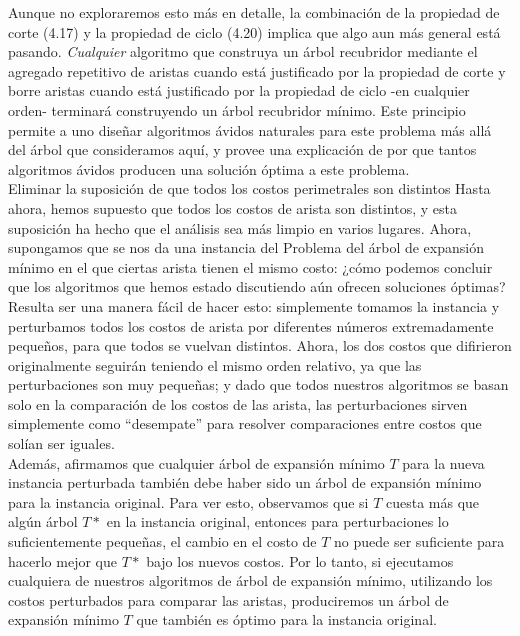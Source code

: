 \documentclass[a4paper, 12pt]{book}
\theoremstyle{dotless}
\begin{document}
Aunque no exploraremos esto más en detalle, la combinación de la propiedad de corte (4.17) y la propiedad de ciclo (4.20) implica que algo aun más general está pasando. \textit{Cualquier} algoritmo que construya un árbol recubridor mediante el agregado repetitivo de aristas cuando está justificado por la propiedad de corte y borre aristas cuando está justificado por la propiedad de ciclo -en cualquier orden- terminará construyendo un árbol recubridor mínimo. Este principio permite a uno diseñar algoritmos ávidos naturales para este problema más allá del árbol que consideramos aquí, y provee una explicación de por que tantos algoritmos ávidos producen una solución óptima a este problema.\\
    
Eliminar la suposición de que todos los costos perimetrales son distintos Hasta ahora, hemos supuesto que todos los costos de arista son distintos, y esta suposición ha hecho que el análisis sea más limpio en varios lugares. Ahora, supongamos que se nos da una instancia del Problema del árbol de expansión mínimo en el que ciertas arista tienen el mismo costo: ¿cómo podemos concluir que los algoritmos que hemos estado discutiendo aún ofrecen soluciones óptimas?\\

Resulta ser una manera fácil de hacer esto: simplemente tomamos la instancia y perturbamos todos los costos de arista por diferentes números extremadamente pequeños, para que todos se vuelvan distintos. Ahora, los dos costos que difirieron originalmente seguirán teniendo el mismo orden relativo, ya que las perturbaciones son muy pequeñas; y dado que todos nuestros algoritmos se basan solo en la comparación de los costos de las arista, las perturbaciones sirven simplemente como ``desempate'' para resolver comparaciones entre costos que solían ser iguales.\\

Además, afirmamos que cualquier árbol de expansión mínimo $T$ para la nueva instancia perturbada también debe haber sido un árbol de expansión mínimo para la instancia original. Para ver esto, observamos que si $T$ cuesta más que algún árbol $T*$ en la instancia original, entonces para perturbaciones lo suficientemente pequeñas, el cambio en el costo de $T$ no puede ser suficiente para hacerlo mejor que $T*$ bajo los nuevos costos. Por lo tanto, si ejecutamos cualquiera de nuestros algoritmos de árbol de expansión mínimo, utilizando los costos perturbados para comparar las aristas, produciremos un árbol de expansión mínimo $T$ que también es óptimo para la instancia original.\\  
% 
% 
\end{document}
